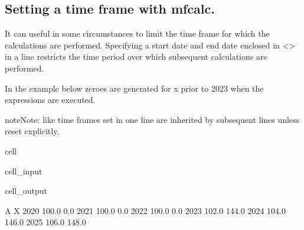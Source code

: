 \documentclass[letterpaper,10pt,english]{jupyterBook}
\begin{document}
\subsection{Setting a time frame with mfcalc.}
\label{\detokenize{content/04_PythonEssentials/mfcalc:setting-a-time-frame-with-mfcalc}}
\sphinxAtStartPar
It can useful in some circumstances to limit the time frame for which the calculations are performed. Specifying a start date and end date enclosed in <> in a line restricts the time period over which subsequent calculations are performed.

\sphinxAtStartPar
In the example below zeroes are generated for x prior to 2023 when the expressions are executed.

\begin{sphinxadmonition}{note}{Note:}
\sphinxAtStartPar
like  time frames set in one line are inherited by subsequent lines unless reset explicitly.
\end{sphinxadmonition}

\begin{sphinxuseclass}{cell}\begin{sphinxVerbatimInput}

\begin{sphinxuseclass}{cell_input}
\begin{sphinxVerbatim}[commandchars=\\\{\}]
  


\end{sphinxVerbatim}

\end{sphinxuseclass}\end{sphinxVerbatimInput}
\begin{sphinxVerbatimOutput}

\begin{sphinxuseclass}{cell_output}
\begin{sphinxVerbatim}[commandchars=\\\{\}]
          A      X
2020  100.0    0.0
2021  100.0    0.0
2022  100.0    0.0
2023  102.0  144.0
2024  104.0  146.0
2025  106.0  148.0
\end{sphinxVerbatim}

\end{sphinxuseclass}\end{sphinxVerbatimOutput}

\end{sphinxuseclass}
\sphinxstepscope
\end{document}
